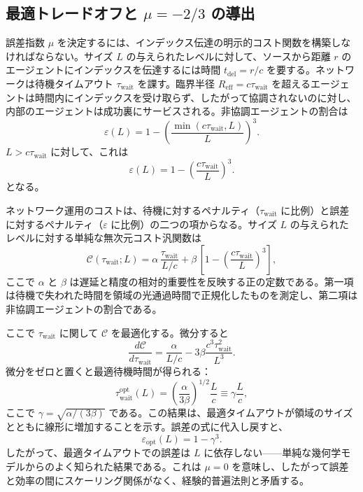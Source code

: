 \documentclass[11pt,a4paper]{article}
\begin{document}
	\subsection{最適トレードオフと \(\mu = -2/3\) の導出}
	誤差指数 \(\mu\) を決定するには、インデックス伝達の明示的コスト関数を構築しなければならない。サイズ \(L\) の与えられたレベルに対して、ソースから距離 \(r\) のエージェントにインデックスを伝達するには時間 \(t_{\mathrm{del}} = r/c\) を要する。ネットワークは待機タイムアウト \(\tau_{\mathrm{wait}}\) を課す。臨界半径 \(R_{\mathrm{eff}} = c\tau_{\mathrm{wait}}\) を超えるエージェントは時間内にインデックスを受け取らず、したがって協調されないのに対し、内部のエージェントは成功裏にサービスされる。非協調エージェントの割合は
	\[
	\varepsilon(L) = 1 - \left(\frac{\min(c\tau_{\mathrm{wait}},L)}{L}\right)^3.
	\]
	\(L > c\tau_{\mathrm{wait}}\) に対して、これは
	\[
	\varepsilon(L) = 1 - \left(\frac{c\tau_{\mathrm{wait}}}{L}\right)^3.
	\]
	となる。
	
	ネットワーク運用のコストは、待機に対するペナルティ（\(\tau_{\mathrm{wait}}\) に比例）と誤差に対するペナルティ（\(\varepsilon\) に比例）の二つの項からなる。サイズ \(L\) の与えられたレベルに対する単純な無次元コスト汎関数は
	\begin{equation}
		\mathcal{C}(\tau_{\mathrm{wait}}; L) = \alpha\, \frac{\tau_{\mathrm{wait}}}{L/c} + \beta\,\left[1 - \left(\frac{c\tau_{\mathrm{wait}}}{L}\right)^3\right],
		\label{eq:cost}
	\end{equation}
	ここで \(\alpha\) と \(\beta\) は遅延と精度の相対的重要性を反映する正の定数である。第一項は待機で失われた時間を領域の光通過時間で正規化したものを測定し、第二項は非協調エージェントの割合である。
	
	ここで \(\tau_{\mathrm{wait}}\) に関して \(\mathcal{C}\) を最適化する。微分すると
	\[
	\frac{d\mathcal{C}}{d\tau_{\mathrm{wait}}} = \frac{\alpha}{L/c} - 3\beta \frac{c^3\tau_{\mathrm{wait}}^2}{L^3}.
	\]
	微分をゼロと置くと最適待機時間が得られる：
	\[
	\tau_{\mathrm{wait}}^{\mathrm{opt}}(L) = \left(\frac{\alpha}{3\beta}\right)^{1/2} \frac{L}{c} \equiv \gamma \frac{L}{c},
	\]
	ここで \(\gamma = \sqrt{\alpha/(3\beta)}\) である。この結果は、最適タイムアウトが領域のサイズとともに線形に増加することを示す。誤差の式に代入し戻すと、
	\[
	\varepsilon_{\mathrm{opt}}(L) = 1 - \gamma^3.
	\]
	したがって、最適タイムアウトでの誤差は \(L\) に依存しない——単純な幾何学モデルからのよく知られた結果である。これは \(\mu = 0\) を意味し、したがって誤差と効率の間にスケーリング関係がなく、経験的普遍法則と矛盾する。
	
\end{document}

